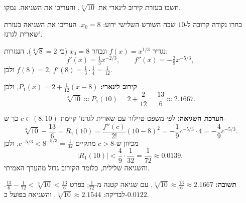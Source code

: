 
\begin{question}
חשבו בעזרת קירוב לינארי את $\sqrt[3]{10}$, והעריכו את השגיאה. נמקו.
\end{question}

\begin{hint}
בחרו נקודה קרובה ל-$10$ שבה השורש השלישי ידוע: $x_0 = 8$. העריכו את השגיאה בעזרת שארית לגרנז'.
\end{hint}

\begin{solution}
נגדיר $f(x) = x^{1/3}$ ונבחר $x_0 = 8$ (כי $\sqrt[3]{8} = 2$). הנגזרות:
\[ f'(x) = \tfrac13x^{-2/3}, \qquad f''(x) = -\tfrac29x^{-5/3}, \]
ולכן $f(8) = 2$, $f'(8) = \frac13\cdot\frac14 = \frac1{12}$.

\textbf{קירוב לינארי:} $P_1(x) = 2 + \frac{1}{12}(x - 8)$, ולכן
\[ \sqrt[3]{10} \approx P_1(10) = 2 + \frac{2}{12} = \frac{13}{6} \approx 2.1667. \]

\textbf{הערכת השגיאה:} לפי משפט טיילור עם שארית לגרנז' קיימת $c \in (8, 10)$ כך ש-
\[ \sqrt[3]{10} - \frac{13}{6} = R_1(10) = \frac{f''(c)}{2!}(10 - 8)^2 = -\frac19c^{-5/3}\cdot 4 = -\frac{4}{9}c^{-5/3}. \]
מכיוון ש-$c > 8$ מתקיים $c^{-5/3} < 8^{-5/3} = \frac1{32}$, ולכן
\[ |R_1(10)| < \frac49\cdot\frac{1}{32} = \frac{1}{72} \approx 0.0139, \]
והשגיאה שלילית, כלומר הקירוב גדול מהערך האמיתי.

\textbf{תשובה:} $\sqrt[3]{10} \approx \frac{13}{6} \approx 2.1667$, עם שגיאה קטנה מ-$\frac{1}{72}$; בפרט $\frac{13}{6} - \frac1{72} < \sqrt[3]{10} < \frac{13}{6}$.
לבדיקה: $\sqrt[3]{10} \approx 2.1544$, והשגיאה בפועל כ-$0.0122$.
\end{solution}
